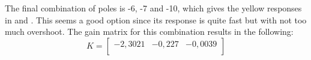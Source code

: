 The final combination of poles is -6, -7 and -10, which gives the yellow responses in  and . This seems a good option since its response is quite fast but with not too much overshoot. The gain matrix for this combination results in the following:
%
\begin{equation}  \label{controllerSS}
	K = 
	\begin{bmatrix}
		-2,3021 & -0,227 & -0,0039 \\
	\end{bmatrix}
\end{equation}
%